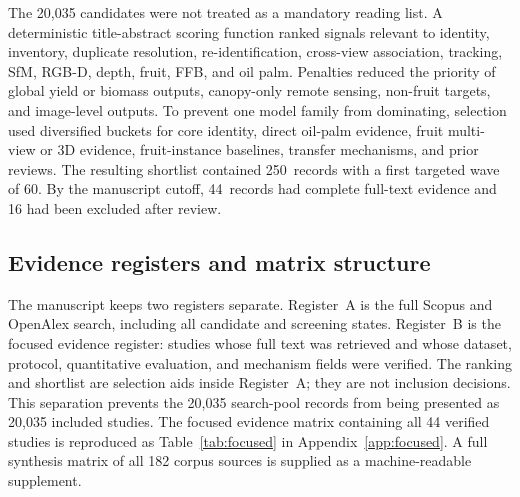 The 20,035 candidates were not treated as a mandatory reading list. A deterministic title-abstract scoring function ranked signals relevant to identity, inventory, duplicate resolution, re-identification, cross-view association, tracking, SfM, RGB-D, depth, fruit, FFB, and oil palm. Penalties reduced the priority of global yield or biomass outputs, canopy-only remote sensing, non-fruit targets, and image-level outputs. To prevent one model family from dominating, selection used diversified buckets for core identity, direct oil-palm evidence, fruit multi-view or 3D evidence, fruit-instance baselines, transfer mechanisms, and prior reviews. The resulting shortlist contained 250~records with a first targeted wave of 60. By the manuscript cutoff, 44~records had complete full-text evidence and 16 had been excluded after review.

\subsection{Evidence registers and matrix structure}

The manuscript keeps two registers separate. Register~A is the full Scopus and OpenAlex search, including all candidate and screening states. Register~B is the focused evidence register: studies whose full text was retrieved and whose dataset, protocol, quantitative evaluation, and mechanism fields were verified. The ranking and shortlist are selection aids inside Register~A; they are not inclusion decisions. This separation prevents the 20,035 search-pool records from being presented as 20,035 included studies. The focused evidence matrix containing all 44 verified studies is reproduced as Table~\ref{tab:focused} in Appendix~\ref{app:focused}. A full synthesis matrix of all 182 corpus sources is supplied as a machine-readable supplement.


